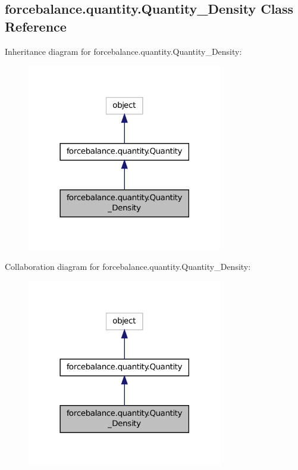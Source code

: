 \hypertarget{classforcebalance_1_1quantity_1_1Quantity__Density}{\subsection{forcebalance.\-quantity.\-Quantity\-\_\-\-Density Class Reference}
\label{classforcebalance_1_1quantity_1_1Quantity__Density}
}


Inheritance diagram for forcebalance.\-quantity.\-Quantity\-\_\-\-Density\-:
\nopagebreak
\begin{figure}[H]
\begin{center}
\leavevmode
\includegraphics[width=242pt]{classforcebalance_1_1quantity_1_1Quantity__Density__inherit__graph}
\end{center}
\end{figure}


Collaboration diagram for forcebalance.\-quantity.\-Quantity\-\_\-\-Density\-:
\nopagebreak
\begin{figure}[H]
\begin{center}
\leavevmode
\includegraphics[width=242pt]{classforcebalance_1_1quantity_1_1Quantity__Density__coll__graph}
\end{center}
\end{figure}
